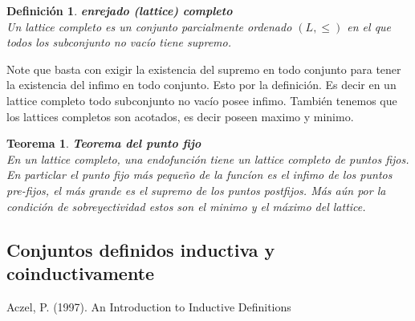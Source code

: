 \documentclass[executivepaper]{article}
\newtheorem{teo}[propo]{Teorema}
\newtheorem{defi}[propo]{Definición}
\begin{document}
\begin{defi}\textbf{enrejado (lattice) completo}\\
    Un lattice completo es un conjunto parcialmente ordenado $(L,\leq)$ en el que todos los subconjunto no vacío tiene supremo.
\end{defi}
Note que basta con exigir la existencia del supremo en todo conjunto para tener la existencia del infimo en todo conjunto. Esto por la definición. Es decir en un lattice completo todo subconjunto no vacío posee infimo. También tenemos que los lattices completos son acotados, es decir poseen maximo y minimo.

\begin{teo}\textbf{Teorema del punto fijo}\\
    En un lattice completo, una endofunción tiene un lattice completo de puntos fijos. En particlar el punto fijo más pequeño de la funcíon es el infimo de los puntos pre-fijos, el más grande es el supremo de los puntos postfijos. Más aún por la condición de sobreyectividad estos son el minimo y el máximo del lattice. 

\subsection{Conjuntos definidos inductiva y coinductivamente}

\end{teo}
\newpage
\begin{thebibliography}{9}
    Aczel, P. (1997). 
    An Introduction to Inductive Definitions
\end{thebibliography}
\end{document}
